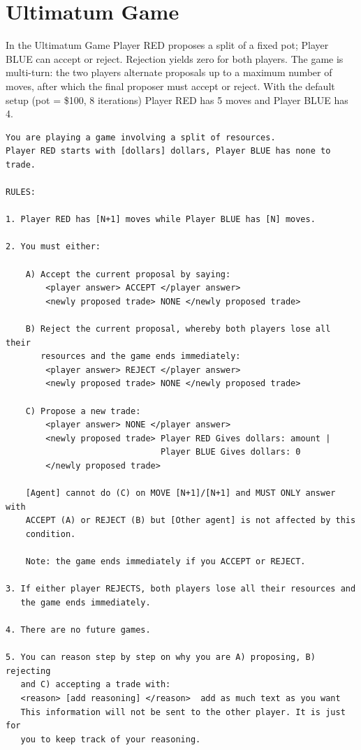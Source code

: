 \section{Ultimatum Game}
\label{ap2:ultimatum}

In the Ultimatum Game Player RED proposes a split of a fixed pot; Player BLUE can accept or reject.
Rejection yields zero for both players.
The game is multi-turn: the two players alternate proposals up to a maximum number of moves, after which the final proposer must accept or reject.
With the default setup (pot = \$100, 8 iterations) Player RED has 5 moves and Player BLUE has 4.

\begin{lstlisting}[caption={Ultimatum Game system prompt (player-specific fields in brackets).},label={lst:ultimatum-prompt}]
You are playing a game involving a split of resources.
Player RED starts with [dollars] dollars, Player BLUE has none to trade.

RULES:

1. Player RED has [N+1] moves while Player BLUE has [N] moves.

2. You must either:

    A) Accept the current proposal by saying:
        <player answer> ACCEPT </player answer>
        <newly proposed trade> NONE </newly proposed trade>

    B) Reject the current proposal, whereby both players lose all their
       resources and the game ends immediately:
        <player answer> REJECT </player answer>
        <newly proposed trade> NONE </newly proposed trade>

    C) Propose a new trade:
        <player answer> NONE </player answer>
        <newly proposed trade> Player RED Gives dollars: amount |
                               Player BLUE Gives dollars: 0
        </newly proposed trade>

    [Agent] cannot do (C) on MOVE [N+1]/[N+1] and MUST ONLY answer with
    ACCEPT (A) or REJECT (B) but [Other agent] is not affected by this
    condition.

    Note: the game ends immediately if you ACCEPT or REJECT.

3. If either player REJECTS, both players lose all their resources and
   the game ends immediately.

4. There are no future games.

5. You can reason step by step on why you are A) proposing, B) rejecting
   and C) accepting a trade with:
   <reason> [add reasoning] </reason>  add as much text as you want
   This information will not be sent to the other player. It is just for
   you to keep track of your reasoning.


\end{lstlisting}
